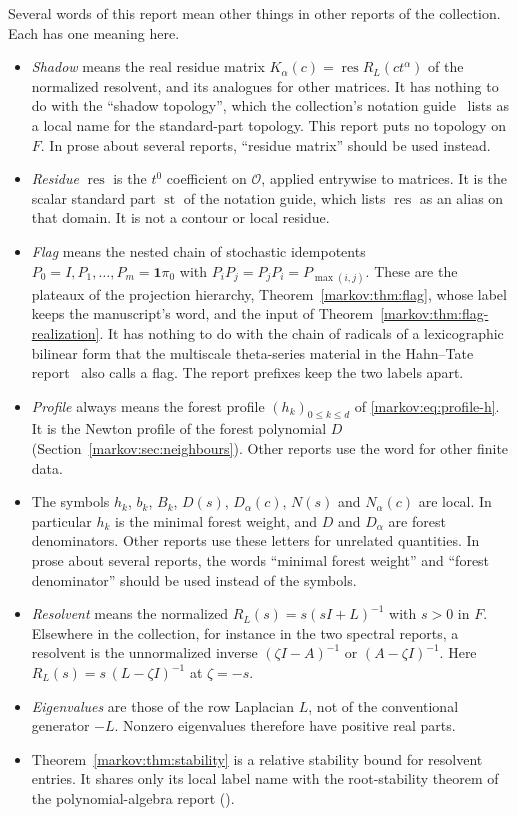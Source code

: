 \documentclass[11pt]{article}
\numberwithin{equation}{section}
\theoremstyle{definition}
\theoremstyle{remark}
\newcommand{\Ocal}{\mathcal O}
\newcommand{\one}{\mathbf 1}
\newcommand{\res}{\operatorname{res}}
\begin{document}
Several words of this report mean other things in other reports of the
collection. Each has one meaning here.
\begin{itemize}
\item \emph{Shadow} means the real residue matrix
$K_\alpha(c)=\res R_L(ct^\alpha)$ of the normalized resolvent, and its analogues
for other matrices. It has nothing to do with the ``shadow topology'', which the
collection's notation guide~\cite{CollNotation} lists as a local name for the
standard-part topology. This report puts no topology on $F$. In prose about
several reports, ``residue matrix'' should be used instead.
\item \emph{Residue} $\res$ is the $t^0$ coefficient on $\Ocal$, applied
entrywise to matrices. It is the scalar standard part $\operatorname{st}$ of the notation
guide, which lists $\res$ as an alias on that domain. It is not a contour or
local residue.
\item \emph{Flag} means the nested chain of stochastic idempotents
$P_0=I,P_1,\ldots,P_m=\one\pi_0$ with $P_iP_j=P_jP_i=P_{\max(i,j)}$. These are
the plateaux of the projection hierarchy, Theorem~\ref{markov:thm:flag}, whose
label keeps the manuscript's word, and the input of
Theorem~\ref{markov:thm:flag-realization}.
It has nothing to do with the chain of radicals of a lexicographic bilinear form
that the multiscale theta-series material in the Hahn--Tate
report~\cite{CollTate} also calls a flag. The report prefixes keep the two labels
apart.
\item \emph{Profile} always means the forest profile $(h_k)_{0\le k\le d}$ of
\eqref{markov:eq:profile-h}. It is the Newton profile of the forest polynomial
$D$ (Section~\ref{markov:sec:neighbours}). Other reports use the word for other
finite data.
\item The symbols $h_k$, $b_k$, $B_k$, $D(s)$, $D_\alpha(c)$, $N(s)$ and
$N_\alpha(c)$ are local. In particular $h_k$ is the minimal forest weight, and
$D$ and $D_\alpha$ are forest denominators. Other reports use these letters for
unrelated quantities. In prose about several reports, the words ``minimal forest
weight'' and ``forest denominator'' should be used instead of the symbols.
\item \emph{Resolvent} means the normalized $R_L(s)=s(sI+L)^{-1}$ with $s>0$ in
$F$. Elsewhere in the collection, for instance in the two spectral reports, a
resolvent is the unnormalized inverse $(\zeta I-A)^{-1}$ or $(A-\zeta I)^{-1}$.
Here $R_L(s)=s\,(L-\zeta I)^{-1}$ at $\zeta=-s$.
\item \emph{Eigenvalues} are those of the row Laplacian $L$, not of the
conventional generator $-L$. Nonzero eigenvalues therefore have positive real
parts.
\item Theorem~\ref{markov:thm:stability} is a relative stability bound for
resolvent entries. It shares only its local label name with the root-stability
theorem of the polynomial-algebra report ().
\end{itemize}
\end{document}
